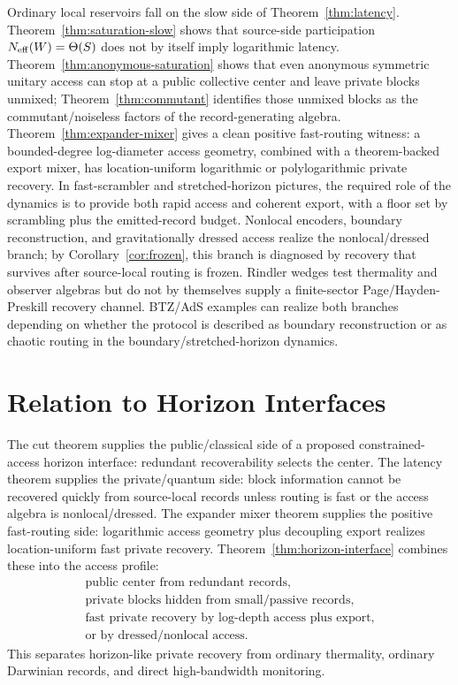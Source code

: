 \documentclass[11pt]{article}
\begin{document}
Ordinary local reservoirs fall on the slow side of
Theorem~\ref{thm:latency}.  Theorem~\ref{thm:saturation-slow} shows that
source-side participation $N_{\rm eff}(W)=\Theta(S)$ does not by itself
imply logarithmic latency.  Theorem~\ref{thm:anonymous-saturation}
shows that even anonymous symmetric unitary access can stop at a public
collective center and leave private blocks unmixed; Theorem~\ref{thm:commutant}
identifies those unmixed blocks as the commutant/noiseless factors of
the record-generating algebra.  Theorem~\ref{thm:expander-mixer} gives a
clean positive fast-routing witness: a bounded-degree log-diameter
access geometry, combined with a theorem-backed export mixer, has
location-uniform logarithmic or polylogarithmic private recovery.  In
fast-scrambler and stretched-horizon pictures, the required role of the
dynamics is to provide both rapid access and coherent export, with a
floor set by scrambling plus the emitted-record budget.  Nonlocal
encoders, boundary reconstruction, and gravitationally dressed access
realize the nonlocal/dressed branch; by Corollary~\ref{cor:frozen}, this
branch is diagnosed by recovery that survives after source-local routing
is frozen.  Rindler wedges test thermality and observer
algebras but do not by themselves supply a finite-sector Page/Hayden-
Preskill recovery channel.  BTZ/AdS examples can realize both branches
depending on whether the protocol is described as boundary
reconstruction or as chaotic routing in the boundary/stretched-horizon
dynamics.

\section{Relation to Horizon Interfaces}

The cut theorem supplies the public/classical side of a proposed
constrained-access horizon interface: redundant recoverability selects
the center.  The latency theorem supplies the private/quantum side:
block information cannot be recovered quickly from source-local records
unless routing is fast or the access algebra is nonlocal/dressed.
The expander mixer theorem supplies the positive fast-routing side:
logarithmic access geometry plus decoupling export realizes
location-uniform fast private recovery.  Theorem~\ref{thm:horizon-interface}
combines these into the access profile:
\begin{equation}
\begin{gathered}
  \text{public center from redundant records,}\\
  \text{private blocks hidden from small/passive records,}\\
  \text{fast private recovery by log-depth access plus export,}\\
  \text{or by dressed/nonlocal access.}
\end{gathered}
\end{equation}
This separates horizon-like private recovery from ordinary thermality,
ordinary Darwinian records, and direct high-bandwidth monitoring.



\end{document}
